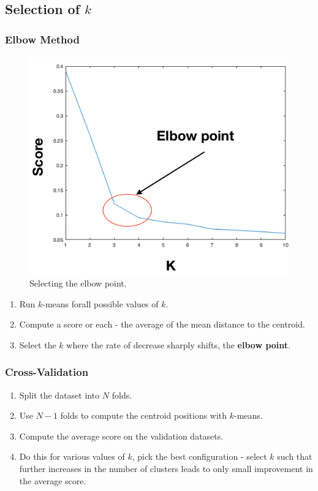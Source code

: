\documentclass[11pt]{article}
\begin{document}
\subsection{Selection of $k$}
\subsubsection{Elbow Method}
\begin{figure}[htb!]
  \centering
  \caption{Selecting the elbow point.}
  \includegraphics[scale=0.3]{elbow}
\end{figure}
\begin{enumerate}
  \item Run $k$-means forall possible values of $k$.
  \item Compute a score or each - the average of the mean distance to the centroid.
  \item Select the $k$ where the rate of decrease sharply shifts, the \textbf{elbow point}.
\end{enumerate}

\subsubsection{Cross-Validation}
\begin{enumerate}
  \item Split the dataset into $N$ folds.
  \item Use $N - 1$ folds to compute the centroid positions with $k$-means.
  \item Compute the average score on the validation datasets.
  \item Do this for various values of $k$, pick the best configuration - select $k$ such that further increases in the number of clusters leads to only small improvement in the average score.
\end{enumerate}
\end{document}
